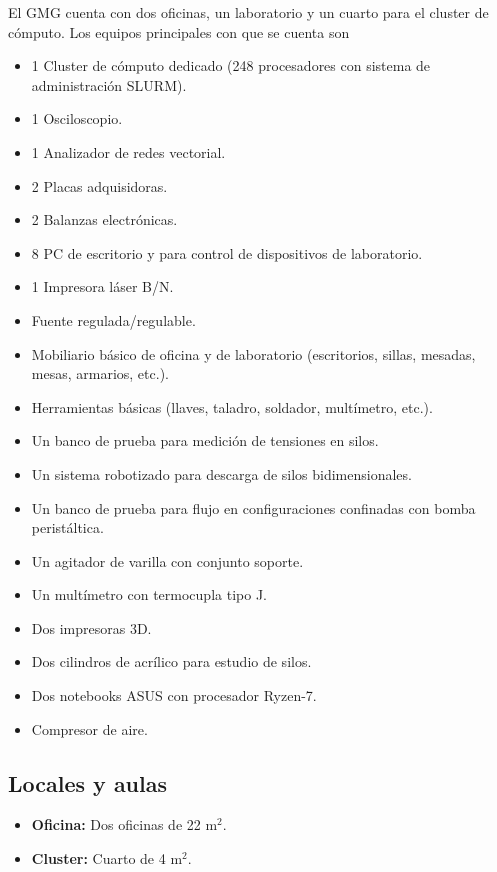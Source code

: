 \documentclass[a4paper,11pt,twoside,final,titlepage,onecolumn,openright]{report}
\begin{document}
El GMG cuenta con dos oficinas, un laboratorio y un cuarto para el cluster de cómputo. Los equipos principales con que se cuenta son

\begin{itemize}
 \item 1 Cluster de cómputo dedicado (248 procesadores con sistema de administración SLURM).
 \item 1 Osciloscopio.
 \item 1 Analizador de redes vectorial.
 \item 2 Placas adquisidoras.
 \item 2 Balanzas electrónicas.
 \item 8 PC de escritorio y para control de dispositivos de laboratorio.
 \item 1 Impresora láser B/N.
 \item Fuente regulada/regulable.
 \item Mobiliario básico de oficina y de laboratorio (escritorios, sillas, mesadas, mesas, armarios, etc.).
 \item Herramientas básicas (llaves, taladro, soldador, multímetro, etc.).
 \item Un banco de prueba para medición de tensiones en silos.
 \item Un sistema robotizado para descarga de silos bidimensionales.
 \item Un banco de prueba para flujo en configuraciones confinadas con bomba peristáltica.
 \item Un agitador de varilla con conjunto soporte.
 \item Un multímetro con termocupla tipo J.
\item Dos impresoras 3D.
\item Dos cilindros de acrílico para estudio de silos.
\item Dos notebooks ASUS con procesador Ryzen-7.
\item Compresor de aire.
\end{itemize}


\subsection{Locales y aulas}

\begin{itemize}
 \item {\bf Oficina:} Dos oficinas de 22 m$^2$. 
 \item {\bf Cluster:} Cuarto de 4 m$^2$. 
\end{itemize}
\end{document}
